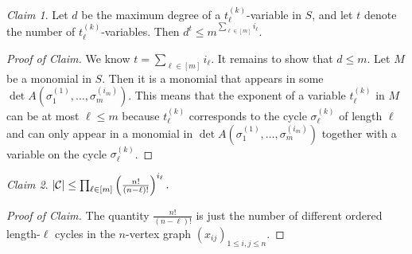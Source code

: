 \documentclass[11pt, DIV=15]{scrarticle}
\theoremstyle{definition}
\theoremstyle{plain}
\theoremstyle{remark}
\newtheorem{claim}{Claim}[definition]
\newenvironment{claimproof}[1][Proof of Claim]{\begin{proof}[#1] \renewcommand{\qedsymbol}{$\lrcorner$}}{ \end{proof}}
\newcommand{\Cc}{{\cal C}}
\begin{document}
\begin{claim}\label{imm:claim2} Let $d$ be the maximum degree of a $t_\ell^{(k)}$-variable in $S$, and let $t$ denote the number of $t_\ell^{(k)}$-variables. Then $d^t \leq m^{\sum_{\ell \in [m]} i_\ell}$.
\end{claim}
\begin{claimproof}
We know $t = \sum_{\ell \in [m]} i_\ell$. It remains to show that $d \leq m$.
Let $M$ be a monomial in $S$. Then it is a monomial that appears in some $\det A(\sigma_1^{(1)},\dots ,\sigma_{m}^{(i_m)})$.
This means that the exponent of a variable $t_\ell^{(k)}$ in $M$ can be at most $\ell \leq m$ because $t_\ell^{(k)}$ corresponds to the cycle $\sigma_\ell^{(k)}$ of length $\ell$ and can only appear in a monomial in $\det A(\sigma_1^{(1)},\dots ,\sigma_{m}^{(i_m)})$ together with a variable on the cycle $\sigma_\ell^{(k)}$.
\end{claimproof}
\begin{claim}\label{imm:claim3}
\(
|\Cc| \leq \prod_{\ell \in [m]} \left(\frac{n!}{(n-\ell)!} \right)^{i_\ell}.
\)
\end{claim}
\begin{claimproof} The quantity $\frac{n!}{(n-\ell)!}$ is just the number of different ordered length-$\ell$ cycles in the $n$-vertex graph $(x_{ij})_{1 \leq i,j \leq n}$.
\end{claimproof}
\end{document}
